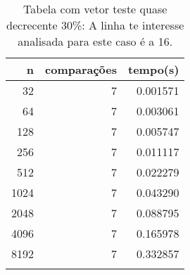 \begin{table}[ht]
\centering
\begin{tabular}{rrr} \toprule
        n &    comparações &       tempo(s) \\ \midrule
      32  &              7 &      0.001571 \\
      64  &              7 &      0.003061 \\
     128  &              7 &      0.005747 \\
     256  &              7 &      0.011117 \\
     512  &              7 &      0.022279 \\
    1024  &              7 &      0.043290 \\
    2048  &              7 &      0.088795 \\
    4096  &              7 &      0.165978 \\
    8192  &              7 &      0.332857 \\
\bottomrule\addlinespace
\end{tabular}
\caption{Tabela com vetor teste quase decrecente 30\%: A linha te interesse analisada para este caso é a 16.}
\label{tab:radixsortQuaseDecresc30}
\end{table}
